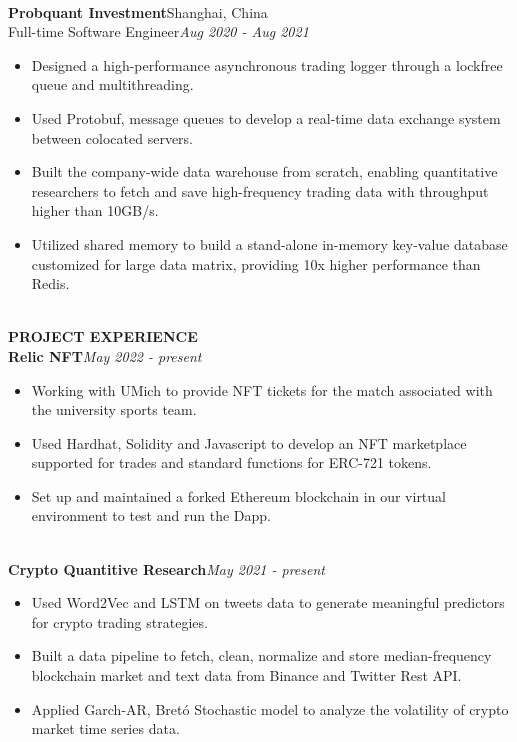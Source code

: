 \documentclass[10pt,a4paper]{article}
\begin{document}
\noindent\\
\textbf{Probquant Investment}\hfill Shanghai, China\\
Full-time Software Engineer\hfill\emph{Aug 2020 - Aug 2021}
\begin{itemize}[noitemsep,topsep=0pt]
    \item Designed a high-performance asynchronous trading logger through a lockfree queue and multithreading.
    \item Used Protobuf, message queues to develop a real-time data exchange system between colocated servers.
    \item Built the company-wide data warehouse from scratch, enabling quantitative researchers to fetch and save high-frequency trading data with throughput higher than 10GB/s.
    \item Utilized shared memory to build a stand-alone in-memory key-value database customized for large data matrix, providing 10x higher performance than Redis.
\end{itemize}
\noindent\\
\rlap{\rule[-1mm]{\linewidth}{.5mm}}\textbf{\large{PROJECT EXPERIENCE}}\\
\textbf{Relic NFT}\hfill\emph{May 2022 - present}
\begin{itemize}[noitemsep,topsep=0pt]
    \item Working with UMich to provide NFT tickets for the match associated with the university sports team.
    \item Used Hardhat, Solidity and Javascript to develop an NFT marketplace supported for trades and standard functions for ERC-721 tokens.
    \item Set up and maintained a forked Ethereum blockchain in our virtual environment to test and run the Dapp.
\end{itemize}
\noindent\\
\textbf{Crypto Quantitive Research}\hfill \emph{May 2021 - present}
\begin{itemize}[noitemsep,topsep=0pt]
    \item Used Word2Vec and LSTM on tweets data to generate meaningful predictors for crypto trading strategies.
    \item Built a data pipeline to fetch, clean, normalize and store median-frequency blockchain market and text data from Binance and Twitter Rest API.
    \item Applied Garch-AR, Bretó Stochastic model to analyze the volatility of crypto market time series data.
\end{itemize}
\end{document}
